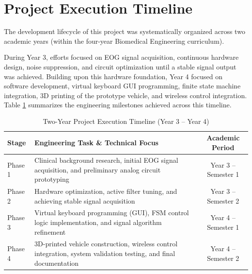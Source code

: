 \section{Project Execution Timeline}
\label{sec:project_execution_timeline}

The development lifecycle of this project was systematically organized across two academic years (within the four-year Biomedical Engineering curriculum).

During Year 3, efforts focused on EOG signal acquisition, continuous hardware design, noise suppression, and circuit optimization until a stable signal output was achieved. Building upon this hardware foundation, Year 4 focused on software development, virtual keyboard GUI programming, finite state machine integration, 3D printing of the prototype vehicle, and wireless control integration. Table \ref{tab:project_timeline} summarizes the engineering milestones achieved across this timeline.

\begin{table}[H]
  \centering
  \caption{Two-Year Project Execution Timeline (Year 3 -- Year 4)}
  \label{tab:project_timeline}
  \begin{tabularx}{\textwidth}{l X c}
    \toprule
    \textbf{Stage} & \textbf{Engineering Task \& Technical Focus} & \textbf{Academic Period} \\
    \midrule
    Phase 1 & Clinical background research, initial EOG signal acquisition, and preliminary analog circuit prototyping & Year 3 -- Semester 1 \\
    Phase 2 & Hardware optimization, active filter tuning, and achieving stable signal acquisition & Year 3 -- Semester 2 \\
    Phase 3 & Virtual keyboard programming (GUI), FSM control logic implementation, and signal algorithm refinement & Year 4 -- Semester 1 \\
    Phase 4 & 3D-printed vehicle construction, wireless control integration, system validation testing, and final documentation & Year 4 -- Semester 2 \\
    \bottomrule
  \end{tabularx}
\end{table}
